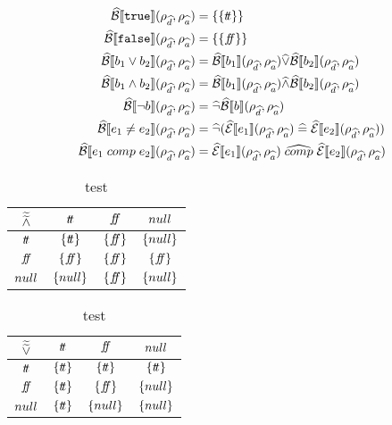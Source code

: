 \begin{align}
    \absboolsem{\texttt{true}}(\rho_{\ab{d}}, \rho_{\ab{a}}) &= \{\{\true\}\} \label{eq:abstract-bool-semantics-start} \\
    \absboolsem{\texttt{false}}(\rho_{\ab{d}}, \rho_{\ab{a}}) &= \{\{\false\}\} \\
    \absboolsem{b_1 \lor b_2}(\rho_{\ab{d}}, \rho_{\ab{a}}) &= \absboolsem{b_1}(\rho_{\ab{d}}, \rho_{\ab{a}}) \ab{\lor} \absboolsem{b_2}(\rho_{\ab{d}}, \rho_{\ab{a}}) \\
    \absboolsem{b_1 \land b_2}(\rho_{\ab{d}}, \rho_{\ab{a}}) &= \absboolsem{b_1}(\rho_{\ab{d}}, \rho_{\ab{a}}) \ab{\land} \absboolsem{b_2}(\rho_{\ab{d}}, \rho_{\ab{a}}) \\
    \absboolsem{\neg b}(\rho_{\ab{d}}, \rho_{\ab{a}}) &= \ab{\neg} \absboolsem{b}(\rho_{\ab{d}}, \rho_{\ab{a}}) \\
    \absboolsem{e_1 \neq e_2}(\rho_{\ab{d}}, \rho_{\ab{a}}) &= \ab{\neg}(\absexpsem{e_1}(\rho_{\ab{d}}, \rho_{\ab{a}}) \;\ab{=}\; \absexpsem{e_2}(\rho_{\ab{d}}, \rho_{\ab{a}})) \\
    \absboolsem{e_1 \;comp\; e_2}(\rho_{\ab{d}}, \rho_{\ab{a}}) &= \absexpsem{e_1}(\rho_{\ab{d}}, \rho_{\ab{a}}) \;\ab{\comp}\; \absexpsem{e_2}(\rho_{\ab{d}}, \rho_{\ab{a}}) \label{eq:abstract-bool-semantics-end}
\end{align}

\begin{table}[H]
    \centering
    \caption{test}
    \begin{tabular}{c|ccc}
        $\widetilde{\widetilde{\land}}$ & $t\!t$ & $f\!\!f$ & $null$ \\
        \hline
        $t\!t$ & $\{t\!t\}$ & $\{f\!\!f\}$ & $\{null\}$ \\
        $f\!\!f$ & $\{f\!\!f\}$ & $\{f\!\!f\}$ & $\{f\!\!f\}$ \\
        $null$ & $\{null\}$ & $\{f\!\!f\}$ & $\{null\}$ \\
    \end{tabular}
    \label{tab:aaabland}
\end{table}

\begin{table}[H]
    \centering
    \caption{test}
    \begin{tabular}{c|ccc}
        $\widetilde{\widetilde{\lor}}$ & $t\!t$ & $f\!\!f$ & $null$ \\
        \hline
        $t\!t$ & $\{t\!t\}$ & $\{t\!t\}$ & $\{t\!t\}$ \\
        $f\!\!f$ & $\{t\!t\}$ & $\{f\!\!f\}$ & $\{null\}$ \\
        $null$ & $\{t\!t\}$ & $\{null\}$ & $\{null\}$ \\
    \end{tabular}
    \label{tab:aaablor}
\end{table}

